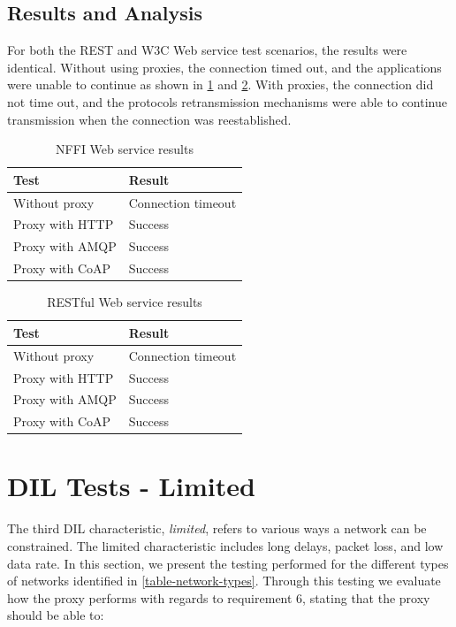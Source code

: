 \subsection{Results and Analysis}

For both the REST and W3C Web service test scenarios, the results were
identical. Without using proxies, the connection timed out, and the applications
were unable to continue as shown in \cref{table:disconnected-nffi} and
\cref{table:disconnected-rest}. With proxies, the connection did not time out,
and the protocols retransmission mechanisms were able to continue transmission
when the connection was reestablished.


\begin{table}[h!]
\begin{tabular}{| l | l |}
\hline
  \textbf{Test} & \textbf{Result} \\ \hline
  Without proxy & Connection timeout \\ \hline
  Proxy with HTTP & Success \\ \hline
  Proxy with AMQP & Success \\ \hline
  Proxy with CoAP & Success \\ \hline
\end{tabular}
\caption{NFFI Web service results}
\label{table:disconnected-nffi}
\end{table}

\begin{table}[h!]
\begin{tabular}{| l | l |}
\hline
  \textbf{Test} & \textbf{Result} \\ \hline
  Without proxy & Connection timeout \\ \hline
  Proxy with HTTP & Success \\ \hline
  Proxy with AMQP & Success \\ \hline
  Proxy with CoAP & Success \\ \hline
\end{tabular}
\caption{RESTful Web service results}
\label{table:disconnected-rest}
\end{table}


\section{DIL Tests - Limited}
\label{section:tests-limited}

The third DIL characteristic, \textit{limited}, refers to various ways a network
can be constrained. The limited characteristic includes long delays, packet
loss, and low data rate. In this section, we present the testing performed for
the different types of networks identified in \cref{table-network-types}.
Through this testing we evaluate how the proxy performs with regards to
requirement 6, stating that the proxy should be able to:

